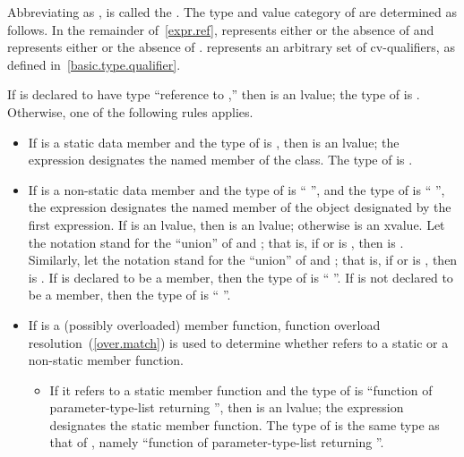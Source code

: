 \pnum
Abbreviating 
as ,
 is called the . The
type and value category of  are determined as follows.
In the remainder of~\ref{expr.ref},  represents either
 or the absence of  and  represents
either  or the absence of . 
represents an arbitrary set of cv-qualifiers, as defined
in~\ref{basic.type.qualifier}.

\pnum
If  is declared to have type ``reference to ,'' then
 is an lvalue; the type of  is .
Otherwise, one of the following rules applies.

\begin{itemize}
\item If  is a static data member and the type of 
is , then  is an lvalue; the expression designates
the named member of the class. The type of  is .

\item If  is a non-static data member and the type of
 is `` '', and the type of 
is `` '', the expression designates the named
member of the object designated by the first expression. If 
is an lvalue, then  is an lvalue;
otherwise  is an xvalue.
Let the notation  stand for the ``union'' of
 and ; that is, if  or 
is , then  is . Similarly,
let the notation  stand for the ``union'' of 
and ; that is, if  or  is
, then  is . If  is
declared to be a  member, then the type of 
is `` ''. If  is not declared to be a
 member, then the type of  is
``  ''.

\item If  is a (possibly overloaded) member function, function
overload resolution~(\ref{over.match}) is used to determine whether
 refers to a static or a non-static member function.

\begin{itemize}
\item If it refers to a static member function and the type of
 is ``function of parameter-type-list returning '',
then  is an lvalue; the expression designates the static
member function. The type of  is the same type as that of
, namely ``function of parameter-type-list returning
''.


\end{itemize}
\end{itemize}
